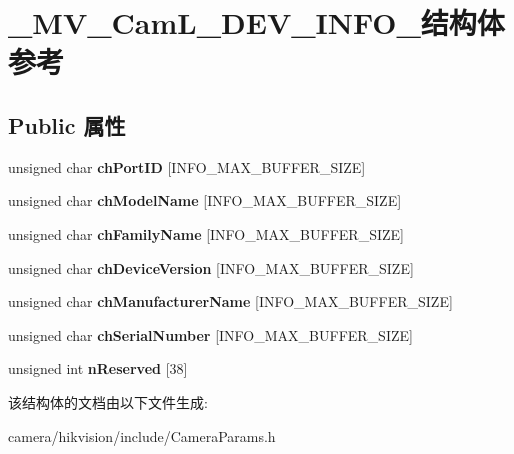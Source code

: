 \hypertarget{struct___m_v___cam_l___d_e_v___i_n_f_o__}{}\section{\+\_\+\+M\+V\+\_\+\+Cam\+L\+\_\+\+D\+E\+V\+\_\+\+I\+N\+F\+O\+\_\+结构体 参考}
\label{struct___m_v___cam_l___d_e_v___i_n_f_o__}
\subsection*{Public 属性}
\begin{DoxyCompactItemize}
\item 
\mbox{\label{struct___m_v___cam_l___d_e_v___i_n_f_o___a875189c5b6a19300f9c6955221754d8f}} 
unsigned char {\bfseries ch\+Port\+ID} \mbox{[}I\+N\+F\+O\+\_\+\+M\+A\+X\+\_\+\+B\+U\+F\+F\+E\+R\+\_\+\+S\+I\+ZE\mbox{]}
\item 
\mbox{\label{struct___m_v___cam_l___d_e_v___i_n_f_o___a13e36ddef6f03268754d3a15ec94353c}} 
unsigned char {\bfseries ch\+Model\+Name} \mbox{[}I\+N\+F\+O\+\_\+\+M\+A\+X\+\_\+\+B\+U\+F\+F\+E\+R\+\_\+\+S\+I\+ZE\mbox{]}
\item 
\mbox{\label{struct___m_v___cam_l___d_e_v___i_n_f_o___a0717da84d70cf3424ab872df7a3c1043}} 
unsigned char {\bfseries ch\+Family\+Name} \mbox{[}I\+N\+F\+O\+\_\+\+M\+A\+X\+\_\+\+B\+U\+F\+F\+E\+R\+\_\+\+S\+I\+ZE\mbox{]}
\item 
\mbox{\label{struct___m_v___cam_l___d_e_v___i_n_f_o___ad502c993f6f9e8fafc1caf1e16db73a9}} 
unsigned char {\bfseries ch\+Device\+Version} \mbox{[}I\+N\+F\+O\+\_\+\+M\+A\+X\+\_\+\+B\+U\+F\+F\+E\+R\+\_\+\+S\+I\+ZE\mbox{]}
\item 
\mbox{\label{struct___m_v___cam_l___d_e_v___i_n_f_o___a2ddce04a73a05680b456b649532cd6f5}} 
unsigned char {\bfseries ch\+Manufacturer\+Name} \mbox{[}I\+N\+F\+O\+\_\+\+M\+A\+X\+\_\+\+B\+U\+F\+F\+E\+R\+\_\+\+S\+I\+ZE\mbox{]}
\item 
\mbox{\label{struct___m_v___cam_l___d_e_v___i_n_f_o___a0234a0a909a88172d8006f4d46cb3abe}} 
unsigned char {\bfseries ch\+Serial\+Number} \mbox{[}I\+N\+F\+O\+\_\+\+M\+A\+X\+\_\+\+B\+U\+F\+F\+E\+R\+\_\+\+S\+I\+ZE\mbox{]}
\item 
\mbox{\label{struct___m_v___cam_l___d_e_v___i_n_f_o___a96a3dfa368b8f71482bb7b931cb0fb9e}} 
unsigned int {\bfseries n\+Reserved} \mbox{[}38\mbox{]}
\end{DoxyCompactItemize}


该结构体的文档由以下文件生成\+:\begin{DoxyCompactItemize}
\item 
camera/hikvision/include/Camera\+Params.\+h\end{DoxyCompactItemize}

